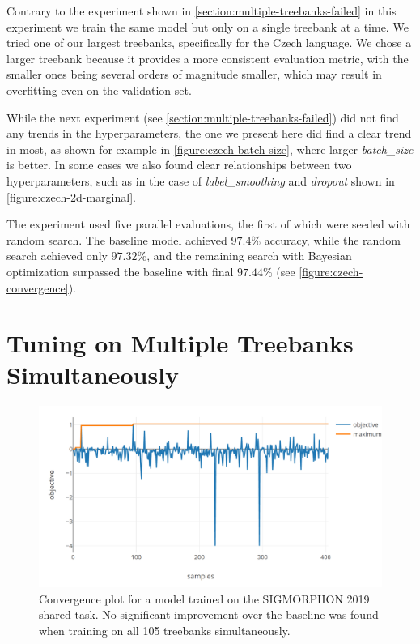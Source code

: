 Contrary to the experiment shown in \autoref{section:multiple-treebanks-failed}
in this experiment we train the same model but only on a single treebank at a
time. We tried one of our largest treebanks, specifically for the Czech
language. We chose a larger treebank because it provides a more consistent
evaluation metric, with the smaller ones being several orders of magnitude
smaller, which may result in overfitting even on the validation set.

While the next experiment (see \autoref{section:multiple-treebanks-failed}) did
not find any trends in the hyperparameters, the one we present here did find a
clear trend in most, as shown for example in \autoref{figure:czech-batch-size},
where larger \emph{batch\_size} is better. In some cases we also found clear
relationships between two hyperparameters, such as in the case of
\emph{label\_smoothing} and \emph{dropout} shown in
\autoref{figure:czech-2d-marginal}.

The experiment used five parallel evaluations, the first of which were seeded
with random search. The baseline model achieved $97.4\%$ accuracy, while the
random search achieved only $97.32\%$, and the remaining search with Bayesian
optimization surpassed the baseline with final $97.44\%$ (see
\autoref{figure:czech-convergence}).


\section{Tuning on Multiple Treebanks Simultaneously}
\label{section:multiple-treebanks-failed}

\begin{figure}[t]
	\begin{center}
		\includegraphics[width=1.0\textwidth]{images/sig-convergence.png}
		\caption{Convergence plot for a model trained on the SIGMORPHON 2019 shared task. No significant improvement over the baseline was found when training on all 105 treebanks simultaneously.}
		\label{figure:sigmorphon-convergence}
	\end{center}
\end{figure}

